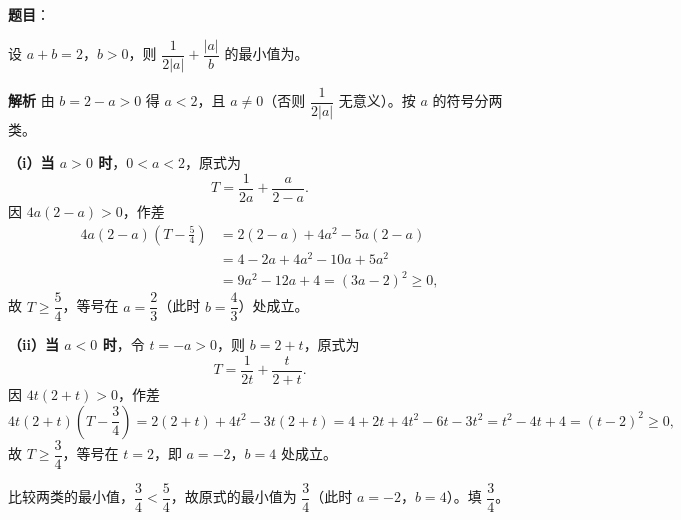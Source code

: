 \begin{answer}

\textbf{题目}：

设 $a+b=2$，$b>0$，则 $\dfrac1{2|a|}+\dfrac{|a|}b$ 的最小值为\gkblank{}。

\textbf{解析}
由 $b=2-a>0$ 得 $a<2$，且 $a\neq0$（否则 $\dfrac1{2|a|}$ 无意义）。按 $a$ 的符号分两类。

\textbf{（i）当 $a>0$ 时}，$0<a<2$，原式为
\nopagebreak[4]
\[T=\frac1{2a}+\frac a{2-a}.\]
因 $4a(2-a)>0$，作差
\nopagebreak[4]
\[\begin{aligned}
4a(2-a)\left(T-\frac54\right)&=2(2-a)+4a^2-5a(2-a)\\
&=4-2a+4a^2-10a+5a^2\\
&=9a^2-12a+4=(3a-2)^2\geqslant0,
\end{aligned}\]
故 $T\geqslant\dfrac54$，等号在 $a=\dfrac23$（此时 $b=\dfrac43$）处成立。

\textbf{（ii）当 $a<0$ 时}，令 $t=-a>0$，则 $b=2+t$，原式为
\nopagebreak[4]
\[T=\frac1{2t}+\frac t{2+t}.\]
因 $4t(2+t)>0$，作差
\nopagebreak[4]
\[4t(2+t)\left(T-\frac34\right)=2(2+t)+4t^2-3t(2+t)=4+2t+4t^2-6t-3t^2=t^2-4t+4=(t-2)^2\geqslant0,\]
故 $T\geqslant\dfrac34$，等号在 $t=2$，即 $a=-2$，$b=4$ 处成立。

比较两类的最小值，$\dfrac34<\dfrac54$，故原式的最小值为 $\dfrac34$（此时 $a=-2$，$b=4$）。填 $\dfrac34$。


\end{answer}
